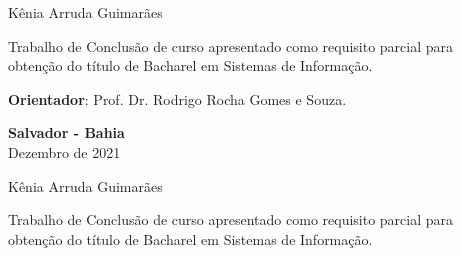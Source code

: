 \documentclass[12pt, a4paper]{report}
\begin{document}
\newpage
\begin{center}

\vspace{4cm}

\large{Kênia Arruda Guimarães}
\end{center}

\vspace{4cm}

\begin{flushright}
\begin{minipage}{8.6cm}
Trabalho de Conclusão de curso apresentado como requisito parcial para obtenção do título de Bacharel em Sistemas de Informação.

\vspace{0.5cm}
\textbf{Orientador}: Prof. Dr. Rodrigo Rocha Gomes e Souza.

\end{minipage}
\end{flushright}
 
\vspace{6.95cm}

\begin{center}
\textbf{Salvador - Bahia} \\
Dezembro de 2021
\end{center}
\thispagestyle{empty} 

\newpage
\begin{center}
\vspace{1.3 cm}
\par{}

\vspace{2cm}

\large{Kênia Arruda Guimarães}
\end{center}

\vspace{1.3 cm}

\begin{flushright}
\begin{minipage}{8.6cm} 
Trabalho de Conclusão de curso apresentado como requisito parcial para obtenção do título de Bacharel em Sistemas de Informação.
\end{minipage}
\end{flushright}
 
\end{document}
